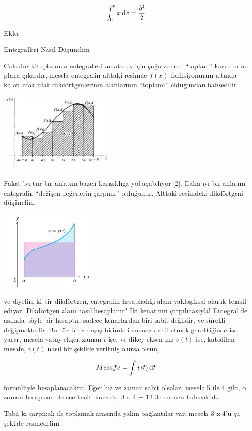\documentclass[12pt,fleqn]{article}\usepackage{../../common}
\begin{document}
$$ 
\int_{0}^{b} x \,\mathrm{d} x = \frac{b^2}{2}
$$


\newpage

Ekler

Entegralleri Nasıl Düşünelim

Calculus kitaplarında entegralleri anlatmak için çoğu zaman ``toplam''
kavramı on plana çıkarılır, mesela entegralin alttaki resimde $f(x)$
fonksiyonunun altında kalan ufak ufak dikdörtgenlerinin alanlarının
``toplamı'' olduğundan bahsedilir.

\includegraphics[height=4cm]{area.png}

Fakat bu tür bir anlatım bazen karışıklığa yol açabiliyor [2]. Daha iyi bir
anlatım entegralin ``değişen değerlerin çarpımı'' olduğudur. Alttaki
resimdeki dikdörtgeni düşünelim, 

\includegraphics[height=4cm]{box.png}

ve diyelim ki bir dikdörtgen, entegralin hesapladığı alanı yaklaşıksal
olarak temsil ediyor. Dikdörtgen alanı nasıl hesaplanır? İki kenarının
çarpılmasıyla! Entegral de aslında böyle bir hesaptır, sadece kenarlardan
biri sabit değildir, ve sürekli değişmektedir. Bu tür bir anlayış birimleri
sonuca dahil etmek gerektiğinde ise yarar, mesela yatay ekşen zaman $t$
işe, ve dikey eksen hız $v(t)$ ise, katedilen mesafe, $v(t)$ nasıl bir
şekilde verilmiş olursa olsun,

$$ Mesafe = \int v(t) \,\mathrm{d} t $$

formülüyle hesaplanacaktır. Eğer hız ve zaman sabit olsalar, mesela 5 ile 4
gibi, o zaman hesap son derece basit olacaktı, 3 x 4 = 12 ile sonucu
bulacaktık. 

Tabii ki çarpmak ile toplamak arasında yakın bağlantılar var, mesela 3 x
4'u şu şekilde resmedelim
\end{document}
